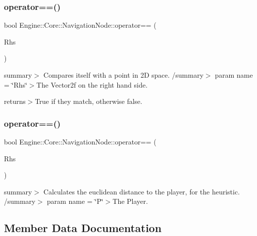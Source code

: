 \subsubsection{\texorpdfstring{operator==()}{operator==()}\hspace{0.1cm}{\footnotesize\ttfamily [1/2]}}
{\footnotesize\ttfamily bool Engine\+::\+Core\+::\+Navigation\+Node\+::operator== (\begin{DoxyParamCaption}\item[{const \hyperlink{struct_engine_1_1_core_1_1_navigation_node}{Navigation\+Node} \&}]{Rhs }\end{DoxyParamCaption})}

summary$>$ Compares itself with a point in 2D space. /summary$>$ param name = \char`\"{}\+Rhs\char`\"{}$>$The Vector2f on the right hand side.

returns$>$True if they match, otherwise false.\mbox{\label{struct_engine_1_1_core_1_1_navigation_node_a4093291628771c2de79b2b1a8ea2ec82}} 
\subsubsection{\texorpdfstring{operator==()}{operator==()}\hspace{0.1cm}{\footnotesize\ttfamily [2/2]}}
{\footnotesize\ttfamily bool Engine\+::\+Core\+::\+Navigation\+Node\+::operator== (\begin{DoxyParamCaption}\item[{const Vector2f \&}]{Rhs }\end{DoxyParamCaption})}

summary$>$ Calculates the euclidean distance to the player, for the heuristic. /summary$>$ param name = \char`\"{}\+P\char`\"{}$>$The Player.

\subsection{Member Data Documentation}
\mbox{\label{struct_engine_1_1_core_1_1_navigation_node_a707b571c58bffbf140fd4f6ebe6a4f37}} 
